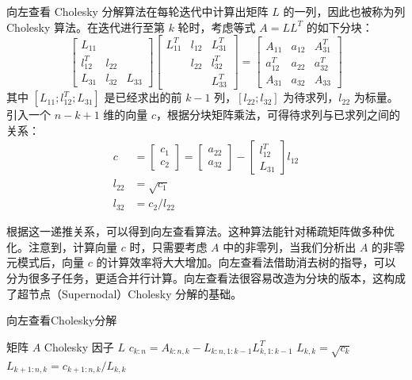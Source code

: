 向左查看 Cholesky 分解算法在每轮迭代中计算出矩阵 $L$ 的一列，因此也被称为列 Cholesky 算法。在迭代进行至第 $k$ 轮时，考虑等式 $A=LL^T$ 的如下分块：
\begin{equation}
\begin{bmatrix}
L_{11} & &\\
l_{12}^T & l_{22} & \\
L_{31} & l_{32} & L_{33}
\end{bmatrix}
\begin{bmatrix}
L_{11}^T & l_{12} & L^T_{31}\\
 & l_{22} & l_{32}^T \\
 &  & L_{33}^T
\end{bmatrix}
=  \begin{bmatrix}
A_{11} & a_{12} & A_{31}^T\\
a_{12}^T & a_{22} &  a_{32}^T\\
A_{31} & a_{32} & A_{33}
\end{bmatrix}
\end{equation}
其中 $[L_{11};l_{12}^T;L_{31}]$ 是已经求出的前 $k-1$ 列，$[l_{22};l_{32}]$ 为待求列，$l_{22}$ 为标量。引入一个 $n-k+1$ 维的向量 $c$，根据分块矩阵乘法，可得待求列与已求列之间的关系：
\begin{align}
c &= \begin{bmatrix}
c_1 \\
c_2
\end{bmatrix} = 
\begin{bmatrix}
a_{22} \\
a_{32}
\end{bmatrix} - \begin{bmatrix}
l_{12}^T \\
L_{31}
\end{bmatrix}l_{12} \\
l_{22}&=\sqrt{c_1}\\
l_{32}&=c_2/l_{22}
\end{align}

根据这一递推关系，可以得到向左查看算法。这种算法能针对稀疏矩阵做多种优化。注意到，计算向量 $c$ 时，只需要考虑 $A$ 中的非零列，当我们分析出 $A$ 的非零元模式后，向量 $c$ 的计算效率将大大增加。向左查看法借助消去树的指导，可以分为很多子任务，更适合并行计算。向左查看法很容易改造为分块的版本，这构成了超节点（Supernodal）Cholesky 分解的基础。

\begin{algorithm}
  \caption{向左查看Cholesky分解}
  \label{alg2}
  \small
  \begin{algorithmic}
  \REQUIRE 矩阵 $A$
  \ENSURE Cholesky 因子 $L$
  \STATE $c_{k:n}=A_{k:n,k}-L_{k:n,1:k-1} L_{k,1:k-1}^T$
  \STATE $L_{k,k}=\sqrt{c_k}$
  \STATE $L_{k+1:n,k}=c_{k+1:n,k}/L_{k,k}$
  \ENDFOR
  \end{algorithmic}
\end{algorithm}


